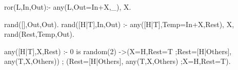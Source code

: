 ror(L,In,Out):- 
	any(L,Out=In+X,_), 
	X.

rand([],Out,Out).
rand([H|T],In,Out) :-
	any([H|T],Temp=In+X,Rest),
	X,
	rand(Rest,Temp,Out).

any([H|T],X,Rest) :-
	0 is random(2)
	->(X=H,Rest=T
          ;Rest=[H|Others],
	   any(T,X,Others))
        ; (Rest=[H|Others],
           any(T,X,Others)
          ;X=H,Rest=T).